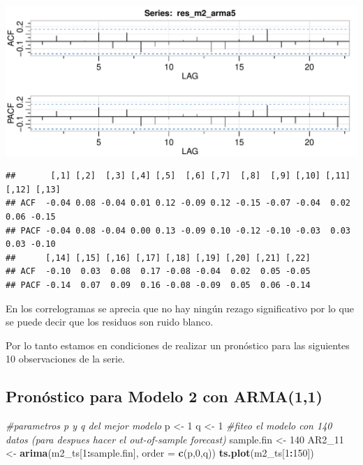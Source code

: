 \documentclass[
  11pt,
]{article}
\newenvironment{Shaded}{\begin{snugshade}}{\end{snugshade}}
\newcommand{\CommentTok}[1]{\textcolor[rgb]{0.56,0.35,0.01}{\textit{#1}}}
\newcommand{\DataTypeTok}[1]{\textcolor[rgb]{0.13,0.29,0.53}{#1}}
\newcommand{\DecValTok}[1]{\textcolor[rgb]{0.00,0.00,0.81}{#1}}
\newcommand{\KeywordTok}[1]{\textcolor[rgb]{0.13,0.29,0.53}{\textbf{#1}}}
\newcommand{\NormalTok}[1]{#1}
\newcommand{\OperatorTok}[1]{\textcolor[rgb]{0.81,0.36,0.00}{\textbf{#1}}}
\newcommand{\StringTok}[1]{\textcolor[rgb]{0.31,0.60,0.02}{#1}}
\begin{document}
\begin{center}\includegraphics[width=0.9\linewidth]{RmdFigs/acf2_arma5-1} \end{center}

\begin{verbatim}
##       [,1] [,2]  [,3] [,4] [,5]  [,6] [,7]  [,8]  [,9] [,10] [,11] [,12] [,13]
## ACF  -0.04 0.08 -0.04 0.01 0.12 -0.09 0.12 -0.15 -0.07 -0.04  0.02  0.06 -0.15
## PACF -0.04 0.08 -0.04 0.00 0.13 -0.09 0.10 -0.12 -0.10 -0.03  0.03  0.03 -0.10
##      [,14] [,15] [,16] [,17] [,18] [,19] [,20] [,21] [,22]
## ACF  -0.10  0.03  0.08  0.17 -0.08 -0.04  0.02  0.05 -0.05
## PACF -0.14  0.07  0.09  0.16 -0.08 -0.09  0.05  0.06 -0.14
\end{verbatim}

En los correlogramas se aprecia que no hay ningún rezago significativo
por lo que se puede decir que los residuos son ruido blanco.

Por lo tanto estamos en condiciones de realizar un pronóstico para las
siguientes 10 observaciones de la serie.

\hypertarget{pronuxf3stico-para-modelo-2-con-arma11}{%
\subsection{Pronóstico para Modelo 2 con
ARMA(1,1)}\label{pronuxf3stico-para-modelo-2-con-arma11}}

\begin{Shaded}
\begin{Highlighting}[]
\CommentTok{#parametros p y q del mejor modelo}
\NormalTok{p <-}\StringTok{ }\DecValTok{1}
\NormalTok{q <-}\StringTok{ }\DecValTok{1}
\CommentTok{#fiteo el modelo con 140 datos (para despues hacer el out-of-sample forecast)}
\NormalTok{sample.fin <-}\StringTok{ }\DecValTok{140}
\NormalTok{AR2_}\DecValTok{11}\NormalTok{ <-}\StringTok{ }\KeywordTok{arima}\NormalTok{(m2_ts[}\DecValTok{1}\OperatorTok{:}\NormalTok{sample.fin], }\DataTypeTok{order =} \KeywordTok{c}\NormalTok{(p,}\DecValTok{0}\NormalTok{,q))}
\KeywordTok{ts.plot}\NormalTok{(m2_ts[}\DecValTok{1}\OperatorTok{:}\DecValTok{150}\NormalTok{])}
\end{Highlighting}
\end{Shaded}
\end{document}
